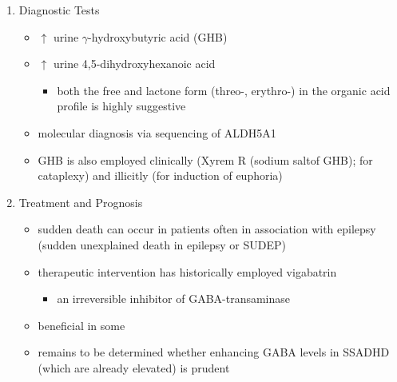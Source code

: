 \documentclass{scrartcl}
\begin{document}
\begin{enumerate}
\item Diagnostic Tests
\label{sec:org8ead317}
\begin{itemize}
\item \(\uparrow\) urine \(\gamma\)-hydroxybutyric acid (GHB)
\item \(\uparrow\) urine 4,5-dihydroxyhexanoic acid
\begin{itemize}
\item both the free and lactone form (threo-, erythro-) in the organic acid profile
is highly suggestive
\end{itemize}
\item molecular diagnosis via sequencing of ALDH5A1
\item GHB is also employed clinically (Xyrem R (sodium saltof GHB); for
cataplexy) and illicitly (for induction of euphoria)
\end{itemize}

\item Treatment and Prognosis
\label{sec:orgcdba1f9}
\begin{itemize}
\item sudden death can occur in patients often in association with
epilepsy (sudden unexplained death in epilepsy or SUDEP)
\item therapeutic intervention has historically employed vigabatrin
\begin{itemize}
\item an irreversible inhibitor of GABA-transaminase
\end{itemize}
\item beneficial in some
\item remains to be determined whether enhancing GABA levels in SSADHD
(which are already elevated) is prudent
\end{itemize}
\end{enumerate}
\end{document}
